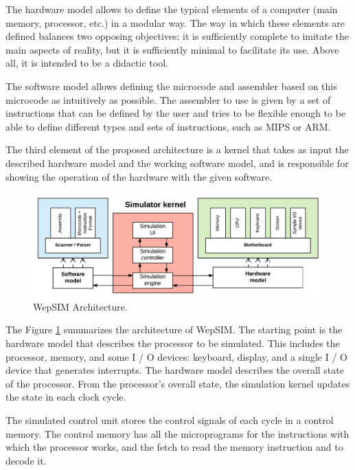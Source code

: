 The hardware model allows to define the typical elements of a computer (main memory, processor, etc.) in a modular way. The way in which these elements are defined balances two opposing objectives: it is sufficiently complete to imitate the main aspects of reality, but it is sufficiently minimal to facilitate its use. Above all, it is intended to be a didactic tool.

The software model allows defining the microcode and assembler based on this microcode as intuitively as possible. The assembler to use is given by a set of instructions that can be defined by the user and tries to be flexible enough to be able to define different types and sets of instructions, such as MIPS or ARM.

The third element of the proposed architecture is a kernel that takes as input the described hardware model and the working software model, and is responsible for showing the operation of the hardware with the given software.

\begin{figure}[htbp]
 	\centering
 	\includegraphics[width=14cm]{figures/architecture_diagram}
 	\caption{WepSIM Architecture.}
	\label{fig:architecture_diagram_summary}
\end{figure}

The Figure \ref{fig:architecture_diagram_summary} summarizes the architecture of WepSIM. The starting point is the hardware model that describes the processor to be simulated. This includes the processor, memory, and some I / O devices: keyboard, display, and a single I / O device that generates interrupts. The hardware model describes the overall state of the processor. From the processor's overall state, the simulation kernel updates the state in each clock cycle.

The simulated control unit stores the control signals of each cycle in a control memory. The control memory has all the microprograms for the instructions with which the processor works, and the fetch to read the memory instruction and to decode it.

